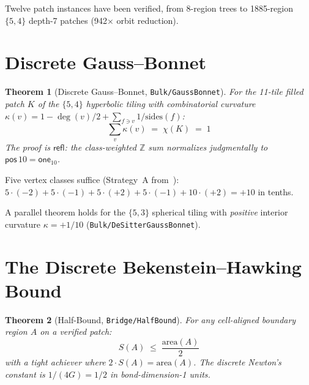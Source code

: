 \documentclass[11pt,a4paper]{article}
\newtheorem{theorem}{Theorem}[section]
\newcommand{\Z}{\mathbb{Z}}
\newcommand{\refl}{\mathsf{refl}}
\newcommand{\module}[1]{\texttt{#1}}
\begin{document}
Twelve patch instances have been verified, from 8-region trees to
1885-region $\{5,4\}$ depth-7 patches (942$\times$ orbit reduction).

\section{Discrete Gauss--Bonnet}
\label{sec:gauss-bonnet}

\begin{theorem}[Discrete Gauss--Bonnet, \module{Bulk/GaussBonnet}]
\label{thm:gauss-bonnet}
For the 11-tile filled patch $K$ of the $\{5,4\}$ hyperbolic tiling
with combinatorial curvature
$\kappa(v) = 1 - \deg(v)/2 + \sum_{f \ni v} 1/\mathrm{sides}(f)$:
\[
  \sum_{v} \kappa(v) \;=\; \chi(K) \;=\; 1
\]
The proof is $\refl$: the class-weighted $\Z$ sum normalizes
judgmentally to $\mathsf{pos}\, 10 = \mathsf{one}_{10}$.
\end{theorem}

Five vertex classes suffice (Strategy~A from~\cite{HaPPYInstance}):
$5 \cdot (-2) + 5 \cdot (-1) + 5 \cdot (+2) + 5 \cdot (-1) +
10 \cdot (+2) = +10$ in tenths.

A parallel theorem holds for the $\{5,3\}$ spherical tiling with
\emph{positive} interior curvature $\kappa = +1/10$
(\module{Bulk/DeSitterGaussBonnet}).

\section{The Discrete Bekenstein--Hawking Bound}
\label{sec:bekenstein}

\begin{theorem}[Half-Bound, \module{Bridge/HalfBound}]
\label{thm:half-bound}
For any cell-aligned boundary region $A$ on a verified patch:
\[
  S(A) \;\leq\; \frac{\mathrm{area}(A)}{2}
\]
with a tight achiever where $2 \cdot S(A) = \mathrm{area}(A)$.
The discrete Newton's constant is $1/(4G) = 1/2$ in
bond-dimension-1 units.
\end{theorem}
\end{document}
